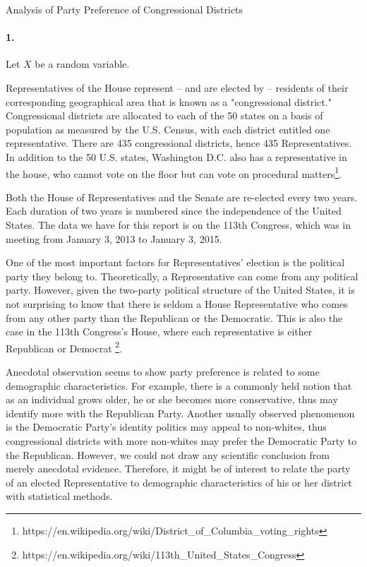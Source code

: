 \documentclass[12pt,a4paper]{article}
\author{Josh Liu}
\title{}
\date{\today}
\begin{document}
	\begin{center}
Analysis of Party Preference of Congressional Districts
		
	\end{center}


\paragraph{1.}

Let $X$ be a random variable.


Representatives of the House represent -- and are elected by -- residents of their corresponding geographical area that is known as a "congressional district." Congressional districts are allocated to each of the 50 states on a basis of population as measured by the U.S. Census, with each district entitled one representative. There are 435 congressional districts, hence 435 Representatives. In addition to the 50 U.S. states, Washington D.C. also has a representative in the house, who cannot vote on the floor but can vote on procedural matters\footnote{https://en.wikipedia.org/wiki/District\_of\_Columbia\_voting\_rights}. 

Both the House of Representatives and the Senate are re-elected every two years. Each duration of two years is numbered since the independence of the United States. The data we have for this report is on the 113th Congress, which was in meeting from January 3, 2013 to January 3, 2015. 

One of the most important factors for Representatives' election is the political party they belong to. Theoretically, a Representative can come from any political party. However, given the two-party political structure of the United States, it is not surprising to know that there is seldom a House Representative who comes from any other party than the Republican or the Democratic. This is also the case in the 113th Congress's House, where each representative is either Republican or Democrat \footnote{https://en.wikipedia.org/wiki/113th\_United\_States\_Congress}.

Anecdotal observation seems to show party preference is related to some demographic characteristics. For example, there is a commonly held notion that as an individual grows older, he or she becomes more conservative, thus may identify more with the Republican Party. Another usually observed phenomenon is the Democratic Party's identity politics may appeal to non-whites, thus  congressional districts with more non-whites may prefer the Democratic Party to the Republican. However, we could not draw any scientific conclusion from merely anecdotal evidence. Therefore, it might be of interest to relate the party of an elected Representative to demographic characteristics of his or her district with statistical methods.
\end{document}
